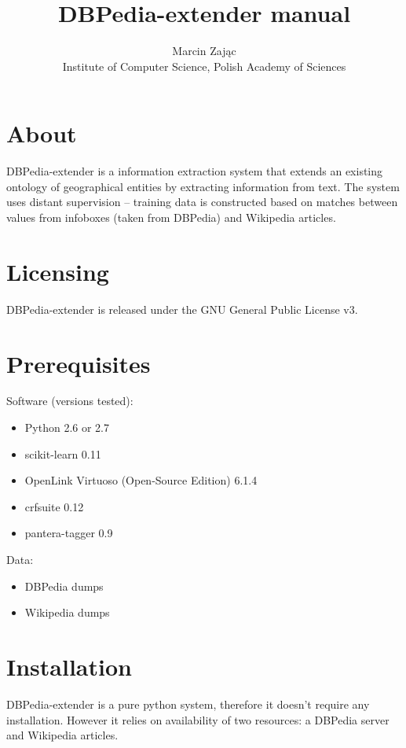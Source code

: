 \documentclass[12pt]{article}
\author{Marcin Zając\\Institute of Computer Science, Polish Academy of Sciences}
\title{DBPedia-extender manual}
\begin{document}
    \maketitle
    \section{About}
    DBPedia-extender is a information extraction system that extends an existing ontology of geographical entities by extracting information from text. The system uses distant supervision – training data is constructed based on matches between values from infoboxes (taken from DBPedia) and Wikipedia articles.
    
    \section{Licensing}
    DBPedia-extender is released under the GNU General Public License v3.

    \section{Prerequisites}
    Software (versions tested):
    \begin{itemize}
        \item Python 2.6 or 2.7
        \item scikit-learn 0.11
        \item OpenLink Virtuoso (Open-Source Edition) 6.1.4
        \item crfsuite 0.12
        \item pantera-tagger 0.9
    \end{itemize}
    Data:
    \begin{itemize}
        \item DBPedia dumps
        \item Wikipedia dumps
    \end{itemize}
    
    \section{Installation}
    DBPedia-extender is a pure python system, therefore it doesn't require any installation.
    However it relies on availability of two resources: a DBPedia server and Wikipedia articles.
\end{document}

